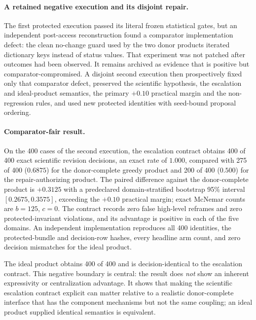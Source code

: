 \paragraph{A retained negative execution and its disjoint repair.}
The first protected execution passed its literal frozen statistical gates, but
an independent post-access reconstruction found a comparator implementation
defect: the clean no-change guard used by the two donor products iterated
dictionary keys instead of status values. That experiment was not patched after
outcomes had been observed. It remains archived as evidence that is positive but
comparator-compromised. A disjoint second execution then prospectively fixed only
that comparator defect, preserved the scientific hypothesis, the escalation and
ideal-product semantics, the primary $+0.10$ practical margin and the
non-regression rules, and used new protected identities with seed-bound proposal
ordering.

\paragraph{Comparator-fair result.}
On the 400 cases of the second execution, the escalation contract obtains 400 of
400 exact scientific revision decisions, an exact rate of $1.000$, compared with
275 of 400 ($0.6875$) for
the donor-complete greedy product and 200 of 400 ($0.500$) for the
repair-authorizing product. The paired difference against the donor-complete
product is $+0.3125$ with a predeclared domain-stratified bootstrap 95\%
interval $[0.2675,0.3575]$, exceeding the $+0.10$ practical margin; exact
McNemar counts are $b=125$, $c=0$. The contract records zero false high-level
reframes and zero protected-invariant violations, and its advantage is positive
in each of the five domains. An independent implementation reproduces all 400
identities, the protected-bundle and decision-row hashes, every headline arm
count, and zero decision mismatches for the ideal product.

The ideal product obtains 400 of 400 and is decision-identical to the escalation
contract. This negative boundary is central: the result does \emph{not} show an
inherent expressivity or centralization advantage. It shows that making the
scientific escalation contract explicit can matter relative to a realistic
donor-complete interface that has the component mechanisms but not the same
coupling; an ideal product supplied identical semantics is equivalent.


